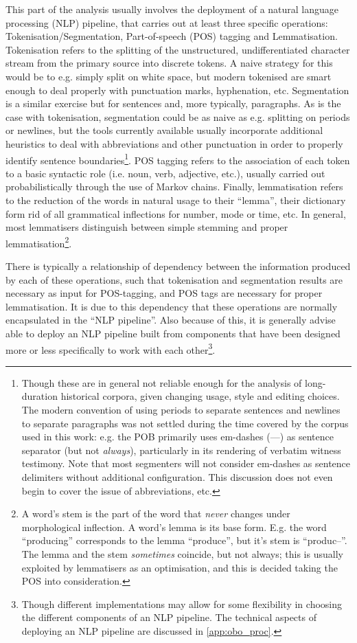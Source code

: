 This part of the analysis usually involves the deployment of a natural language processing (NLP) pipeline, that carries out at least three specific operations: Tokenisation/Segmentation, Part-of-speech (POS) tagging and Lemmatisation.
Tokenisation refers to the splitting of the unstructured, undifferentiated character stream from the primary source into discrete tokens. A naive strategy for this would be to e.g. simply split on white space, but modern tokenised are smart enough to deal properly with punctuation marks, hyphenation, etc.
Segmentation is a similar exercise but for sentences and, more typically, paragraphs.
As is the case with tokenisation, segmentation could be as naive as e.g. splitting on periods or newlines, but the tools currently available usually incorporate additional heuristics to deal with abbreviations and other punctuation in order to properly identify sentence boundaries\footnote{
    \label{foot:sentences}
    Though these are in general not reliable enough for the analysis of long-duration historical corpora, given changing usage, style and editing choices.
    The modern convention of using periods to separate sentences and newlines to separate paragraphs was not settled during the time covered by the corpus used in this work: e.g. the POB primarily uses em-dashes (---) as sentence separator (but not \emph{always}), particularly in its rendering of verbatim witness testimony.
    Note that most segmenters will not consider em-dashes as sentence delimiters without additional configuration.
    This discussion does not even begin to cover the issue of abbreviations, etc.
}.
POS tagging refers to the association of each token to a basic syntactic role (i.e. noun, verb, adjective, etc.), usually carried out probabilistically through the use of Markov chains.
Finally, lemmatisation refers to the reduction of the words in natural usage to their ``lemma'', their dictionary form rid of all grammatical inflections for number, mode or time, etc.
In general, most lemmatisers distinguish between simple stemming and proper lemmatisation\footnote{
    A word's stem is the part of the word that \emph{never} changes under morphological inflection.
    A word's lemma is its base form.
    E.g. the word ``producing'' corresponds to the lemma ``produce'', but it's stem is ``produc--''.
    The lemma and the stem \emph{sometimes} coincide, but not always; this is usually exploited by lemmatisers as an optimisation, and this is decided taking the POS into consideration.
}.

There is typically a relationship of dependency between the information produced by each of these operations, such that tokenisation and segmentation results are necessary as input for POS-tagging, and POS tags are necessary for proper lemmatisation.
It is due to this dependency that these operations are normally encapsulated in the ``NLP pipeline''.
Also because of this, it is generally advise able to deploy an NLP pipeline built from components that have been designed more or less specifically to work with each other\footnote{
    Though different implementations may allow for some flexibility in choosing the different components of an NLP pipeline.
    The technical aspects of deploying an NLP pipeline are discussed in \autoref{app:obo_proc}.
}.


